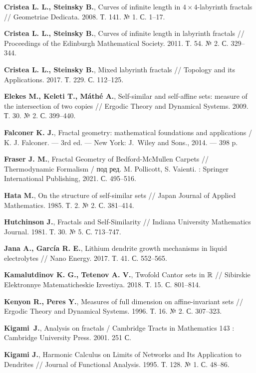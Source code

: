 \begin{thebibliography}{99}
{\bf Cristea L. L., Steinsky B.},
Curves of infinite length in $4\times4$-labyrinth fractals // 
Geometriae Dedicata. 2008. Т. 141. № 1. С. 1--17.


{\bf Cristea L. L., Steinsky B.},
Curves of infinite length in labyrinth fractals // 
Proceedings of the Edinburgh Mathematical Society. 2011. Т. 54. № 2. С. 329--344.


{\bf Cristea L. L., Steinsky B.},
Mixed labyrinth fractals // 
Topology and its Applications. 2017. Т. 229. С. 112--125.

{\bf Elekes M., Keleti T., Máthé A.}, 
Self-similar and self-affine sets: measure of the intersection of two copies // Ergodic Theory and Dynamical Systems. 2009. Т. 30. № 2. С. 399--440.

{\bf Falconer K. J.},
Fractal geometry: mathematical foundations and applications / 
K. J. Falconer. --- 3rd ed. --- New York: J.~Wiley and Sons., 2014. --- 398 p.

{\bf Fraser J. M.},
Fractal Geometry of Bedford-McMullen Carpets // 
Thermodynamic Formalism / под ред. M. Pollicott, S. Vaienti. : Springer International Publishing, 2021. С. 495--516.

{\bf Hata M.},
On the structure of self-similar sets // 
Japan Journal of Applied Mathematics. 1985. Т. 2. № 2. С. 381--414.

{\bf Hutchinson J.},
Fractals and Self-Similarity // 
Indiana University Mathematics Journal. 1981. Т. 30. № 5. С. 713--747.

{\bf Jana A., García R. E.}, Lithium dendrite growth mechanisms in liquid electrolytes // Nano Energy. 2017. Т. 41. С. 552--565.

{\bf Kamalutdinov K. G., Tetenov A. V.},
Twofold Cantor sets in $\mathbb{R}$ // 
Sibirskie Elektronnye Matematicheskie Izvestiya. 2018. Т. 15. С. 801--814.

{\bf Kenyon R., Peres Y.}, 
Measures of full dimension on affine-invariant sets // 
Ergodic Theory and Dynamical Systems. 1996. Т. 16. № 2. С. 307--323.

{\bf Kigami~J.}, 
Analysis on fractals / Cambridge Tracts in Mathematics 143 : 
Cambridge University Press. 2001. 251 С.

{\bf Kigami J.}, 
Harmonic Calculus on Limits of Networks and Its Application to Dendrites // 
Journal of Functional Analysis. 1995. Т. 128. № 1. С. 48--86.


\end{thebibliography}
